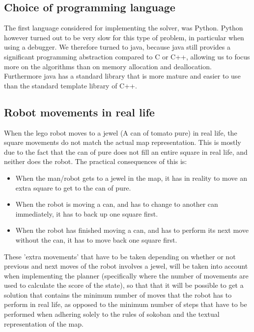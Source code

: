 \subsection{Choice of programming language}
The first language considered for implementing the solver, was Python. Python however turned out to be very slow for this type of problem, in particular when using a debugger. We therefore turned to java, because java still provides a significant programming abstraction compared to C or C++, allowing us to focus more on the algorithms than on memory allocation and deallocation. Furthermore java has a standard library that is more mature and easier to use than the standard template library of C++. 

\subsection{Robot movements in real life}
When the lego robot moves to a jewel (A can of tomato pure) in real life, the square movements do not match the actual map representation. This is mostly due to the fact that the can of pure does not fill an entire square in real life, and neither does the robot. The practical consequences of this is:
\begin{itemize}
\item When the man/robot gets to a jewel in the map, it has in reality to move an extra square to get to the can of pure.
\item When the robot is moving a can, and has to change to another can immediately, it has to back up one square first.
\item When the robot has finished moving a can, and has to perform its next move without the can, it has to move back one square first.
\end{itemize}
 
These 'extra movements' that have to be taken depending on whether or not previous and next moves of the robot involves a jewel,  will be taken into account when implementing the planner (specifically where the number of movements are used to calculate the score of the state), so that that it will be possible to get a solution that contains the minimum number of moves that the robot has to perform in real life, as opposed to the minimum number of steps that have to be performed when adhering solely to the rules of sokoban and the textual representation of the map.

